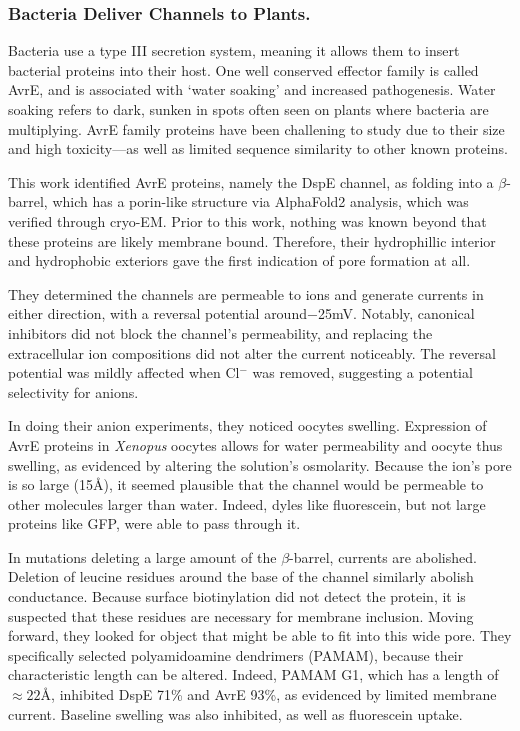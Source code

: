 \subsubsection{Bacteria Deliver Channels to Plants.}
Bacteria use a type III secretion system, meaning it allows them to insert bacterial proteins into their host. One well conserved effector family is called AvrE, and is associated with `water soaking' and increased pathogenesis. Water soaking refers to dark, sunken in spots often seen on plants where bacteria are multiplying. AvrE family proteins have been challening to study due to their size and high toxicity---as well as limited sequence similarity to other known proteins.\newline

This work identified AvrE proteins, namely the DspE channel, as folding into a $\beta$-barrel, which has a porin-like structure via AlphaFold2 analysis, which was verified through cryo-EM. Prior to this work, nothing was known beyond that these proteins are likely membrane bound. Therefore, their hydrophillic interior and hydrophobic exteriors gave the first indication of pore formation at all.\newline

They determined the channels are permeable to ions and generate currents in either direction, with a reversal potential around$-$25mV. Notably, canonical inhibitors did not block the channel's permeability, and replacing the extracellular ion compositions did not alter the current noticeably. The reversal potential was mildly affected when Cl${}^-$ was removed, suggesting a potential selectivity for anions.\newline 

In doing their anion experiments, they noticed oocytes swelling. Expression of AvrE proteins in \textit{Xenopus} oocytes allows for water permeability and oocyte thus swelling, as evidenced by altering the solution's osmolarity. Because the ion's pore is so large (15\AA), it seemed plausible that the channel would be permeable to other molecules larger than water. Indeed, dyles like fluorescein, but not large proteins like GFP, were able to pass through it. \newline

In mutations deleting a large amount of the $\beta$-barrel, currents are abolished. Deletion of leucine residues around the base of the channel similarly abolish conductance. Because surface biotinylation did not detect the protein, it is suspected that these residues are necessary for membrane inclusion. Moving forward, they looked for object that might be able to fit into this wide pore. They specifically selected polyamidoamine dendrimers (PAMAM), because their characteristic length can be altered. Indeed, PAMAM G1, which has a length of $\approx 22$\AA, inhibited DspE 71\% and AvrE 93\%, as evidenced by limited membrane current. Baseline swelling was also inhibited, as well as fluorescein uptake.\newline

